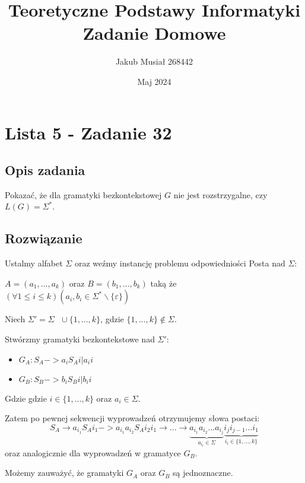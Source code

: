 \documentclass[12pt]{article}
\title{Teoretyczne Podstawy Informatyki \newline Zadanie Domowe}
\author{Jakub Musiał 268442}
\date{Maj 2024}
\begin{document}
\maketitle

\hspace{1cm}

\section*{Lista 5 - Zadanie 32}

\subsection*{Opis zadania}
    Pokazać, że dla gramatyki bezkontekstowej $G$ nie jest rozstrzygalne, czy $L(G) = \Sigma^\ast$.

\subsection*{Rozwiązanie}
    Ustalmy alfabet $\Sigma$ oraz weźmy instancję problemu odpowiedniości Posta nad $\Sigma$:
    \begin{center}
        $A = (a_1, ..., a_k)$ oraz $B = (b_1, ..., b_k)$ taką że $(\forall 1 \leq i \leq k)(a_i, b_i \in \Sigma^\ast \backslash \{\varepsilon\})$
    \end{center}

    \noindent Niech $\Sigma' = \Sigma \text{ } \cup \{1, ..., k\}$, gdzie $\{1, ..., k\} \notin \Sigma$.

    \noindent \newline

    \noindent Stwórzmy gramatyki bezkontekstowe nad $\Sigma'$:
    \begin{itemize}
        \item $G_A : S_A -> a_iS_Ai | a_ii$
        \item $G_B : S_B -> b_iS_Bi | b_ii$
    \end{itemize}
    \noindent Gdzie gdzie $i \in \{1, ..., k\}$ oraz $a_i \in \Sigma$.

    \noindent Zatem po pewnej sekwencji wyprowadzeń otrzymujemy słowa postaci:
    $$
    S_A \rightarrow a_{i_1}S_Ai_1 -> a_{i_1}a_{i_2}S_Ai_2i_1 \rightarrow ... \rightarrow \underbrace{a_{i_1}a_{i_2}...a_{i_j}}_{a_{i_l} \in \Sigma}\underbrace{i_ji_{j - 1}...i_1}_{i_l \in \{1, ..., k\}}
    $$
    \noindent oraz analogicznie dla wyprowadzeń w gramatyce $G_B$.

    \noindent Możemy zauważyć, że gramatyki $G_A$ oraz $G_B$ są jednoznaczne.
\end{document}
